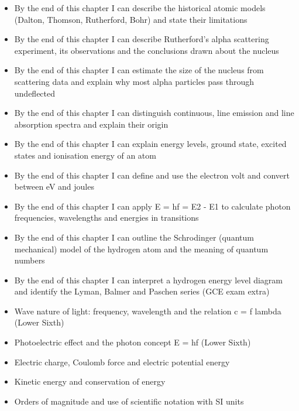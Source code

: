 \documentclass[11pt]{article}
\begin{document}
\begin{objectifs}
\begin{itemize}
\item By the end of this chapter I can describe the historical atomic models (Dalton, Thomson, Rutherford, Bohr) and state their limitations
\item By the end of this chapter I can describe Rutherford's alpha scattering experiment, its observations and the conclusions drawn about the nucleus
\item By the end of this chapter I can estimate the size of the nucleus from scattering data and explain why most alpha particles pass through undeflected
\item By the end of this chapter I can distinguish continuous, line emission and line absorption spectra and explain their origin
\item By the end of this chapter I can explain energy levels, ground state, excited states and ionisation energy of an atom
\item By the end of this chapter I can define and use the electron volt and convert between eV and joules
\item By the end of this chapter I can apply E = hf = E2 - E1 to calculate photon frequencies, wavelengths and energies in transitions
\item By the end of this chapter I can outline the Schrodinger (quantum mechanical) model of the hydrogen atom and the meaning of quantum numbers
\item By the end of this chapter I can interpret a hydrogen energy level diagram and identify the Lyman, Balmer and Paschen series (GCE exam extra)
\end{itemize}
\end{objectifs}

\begin{prerequis}
\begin{itemize}
\item Wave nature of light: frequency, wavelength and the relation c = f lambda (Lower Sixth)
\item Photoelectric effect and the photon concept E = hf (Lower Sixth)
\item Electric charge, Coulomb force and electric potential energy
\item Kinetic energy and conservation of energy
\item Orders of magnitude and use of scientific notation with SI units
\end{itemize}
\end{prerequis}
\end{document}
